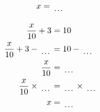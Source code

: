 \documentclass[12pt]{article}
\newcounter{minipagecount}
\begin{document}
\begin{multicols}{2}
\begin{minipage}[t]{0.45\textwidth}
\begin{align*}
        x &= \dotuline{\hspace{5mm}}\\
    \end{align*}
\end{minipage} %
\noindent{(\theminipagecount)}\hspace{0.1mm} %
\begin{minipage}[t]{0.45\textwidth} %
    \vspace{-26pt}  %
    \raggedright %
    \begin{align*} %
        \frac{x}{10} + 3 &= 10\\
        \frac{x}{10} + 3 - \dotuline{\hspace{5mm}} &= 10 - \dotuline{\hspace{5mm}}\\
        \frac{x}{10} &= \dotuline{\hspace{5mm}}\\
        \frac{x}{10} \times\dotuline{\hspace{5mm}} &= \dotuline{\hspace{5mm}} \times\dotuline{\hspace{5mm}}\\
        x &= \dotuline{\hspace{5mm}}\\
    \end{align*}
\end{minipage} %
\noindent{(\theminipagecount)}\hspace{0.1mm} %
\begin{minipage}[t]{0.45\textwidth} %
    \vspace{-26pt}  %

\end{minipage}
\end{multicols}
\end{document}
